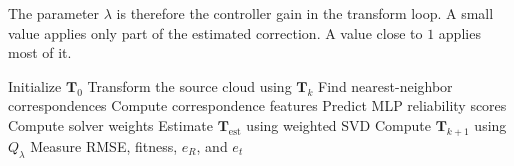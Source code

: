 \documentclass[conference]{IEEEtran}
\newcommand{\T}{\bm{T}}
\newcommand{\Test}{\T_{\mathrm{est}}}
\begin{document}
The parameter $\lambda$ is therefore the controller gain in the transform loop. A small value applies only part of the estimated correction. A value close to $1$ applies most of it.

\begin{algorithm}[t]
\caption{Transform loop}
\label{alg:transform_loop}
\begin{algorithmic}[1]
\State Initialize $\T_0$
    \State Transform the source cloud using $\T_k$
    \State Find nearest-neighbor correspondences
    \State Compute correspondence features
    \State Predict MLP reliability scores
    \State Compute solver weights
    \State Estimate $\Test$ using weighted SVD
    \State Compute $\T_{k+1}$ using $Q_\lambda$
    \State Measure RMSE, fitness, $e_R$, and $e_t$
\EndFor
\end{algorithmic}
\end{algorithm}
\end{document}
